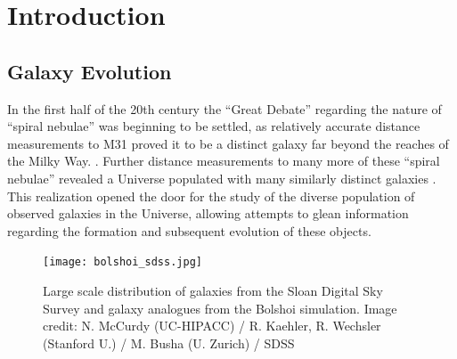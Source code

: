 \chapter{Introduction}
\label{chap:intro}

\section{Galaxy Evolution}
\label{sec:gal_evolution}

In the first half of the 20th century the ``Great Debate'' regarding
the nature of ``spiral nebulae'' was beginning to be settled, as
relatively accurate distance measurements to M31 proved it to be a
distinct galaxy far beyond the reaches of the Milky
Way. \citep{opik1922, hubble1925}.  Further distance measurements to
many more of these ``spiral nebulae'' revealed a Universe populated with
many similarly distinct galaxies \citep{hubble1926}.  This realization
opened the door for
the study of the diverse population of observed galaxies in the
Universe, allowing attempts to glean information regarding the formation
and subsequent evolution of these objects.

\begin{figure}[!ht]
  \centering
  \texttt{[image: bolshoi\_sdss.jpg]}
  \caption[Large scale galaxy distribution from SDSS and Bolshoi
    simulation]{Large scale distribution of galaxies from the Sloan
    Digital 
  Sky Survey and galaxy analogues from the Bolshoi simulation.  Image
  credit: N. McCurdy (UC-HIPACC) / R. Kaehler, R. Wechsler (Stanford
  U.) / M. Busha (U. Zurich) / SDSS}
  \label{fig:bolshoi_sdss}
\end{figure}


